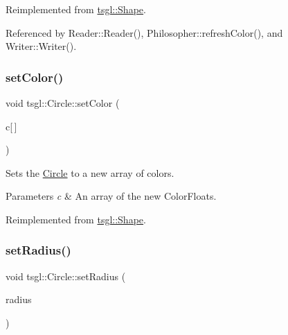 Reimplemented from \hyperlink{classtsgl_1_1_shape_abdb01321cddfd2db1481eefbc2836f70}{tsgl\+::\+Shape}.



Referenced by Reader\+::\+Reader(), Philosopher\+::refresh\+Color(), and Writer\+::\+Writer().

\mbox{\label{classtsgl_1_1_circle_aa25c336d07fb8216bd5d6f63f53a2271}} 
\subsubsection{\texorpdfstring{set\+Color()}{setColor()}\hspace{0.1cm}{\footnotesize\ttfamily [2/2]}}
{\footnotesize\ttfamily void tsgl\+::\+Circle\+::set\+Color (\begin{DoxyParamCaption}\item[{\hyperlink{structtsgl_1_1_color_float}{Color\+Float}}]{c\mbox{[}$\,$\mbox{]} }\end{DoxyParamCaption})\hspace{0.3cm}{\ttfamily [virtual]}}



Sets the \hyperlink{classtsgl_1_1_circle}{Circle} to a new array of colors. 


\begin{DoxyParams}{Parameters}
{\em c} & An array of the new Color\+Floats. \\
\hline
\end{DoxyParams}


Reimplemented from \hyperlink{classtsgl_1_1_shape_ad7e554b5d4cea111ec518548b9f21388}{tsgl\+::\+Shape}.

\mbox{\label{classtsgl_1_1_circle_a515710a6bbec274a1b8686c0d427a0d5}} 
\subsubsection{\texorpdfstring{set\+Radius()}{setRadius()}}
{\footnotesize\ttfamily void tsgl\+::\+Circle\+::set\+Radius (\begin{DoxyParamCaption}\item[{G\+Lfloat}]{radius }\end{DoxyParamCaption})}



